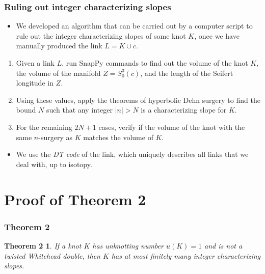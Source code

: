 \documentclass{beamer}
\newtheorem{theorem2}[theorem]{Theorem 2}
\theoremstyle{ex}
\theoremstyle{rem}
\begin{document}
	\begin{frame}
	\frametitle{Ruling out integer characterizing slopes}
	\begin{itemize}
		\item We developed an algorithm that can be carried out by a computer script to rule out the integer characterizing slopes of some knot $K$, once we have manually produced the link $L = K \cup c$.
	\end{itemize}
	\begin{enumerate}
		\item Given a link $L$, run SnapPy commands to find out the volume of the knot $K$, the volume of the manifold $Z = S_0^3(c)$, and the length of the Seifert longitude in $Z$.
		\item Using these values, apply the theorems of hyperbolic Dehn surgery to find the bound $N$ such that any integer $|n| > N$ is a characterizing slope for $K$.
		\item  For the remaining $2N + 1$ cases, verify if the volume of the knot with the same $n$-surgery as $K$ matches the volume of $K$.
	\end{enumerate}
	\begin{itemize}
		\item We use the \textit{DT code} of the link, which uniquely describes all links that we deal with, up to isotopy.
	\end{itemize}
\end{frame}



\section{Proof of Theorem 2}
	\begin{frame}
		\frametitle{Theorem 2}
		\begin{theorem2}
			If a knot $K$ has unknotting number $u(K)=1$ and is not a twisted Whitehead double, then $K$ has at most finitely many integer characterizing slopes.
		\end{theorem2}
	\end{frame}
		
\end{document}
